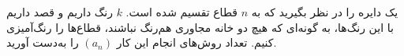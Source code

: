     \p 
یک دایره را در نظر بگیرید که به
$n$
قطاع تقسیم شده است.
$k$
رنگ داریم و قصد داریم با این رنگ‌ها، به گونه‌ای که هیچ دو خانه مجاوری هم‌رنگ نباشند، قطاع‌ها را رنگ‌آمیزی کنیم. تعداد روش‌های انجام این کار
$(a_n)$
را به‌دست آورید.